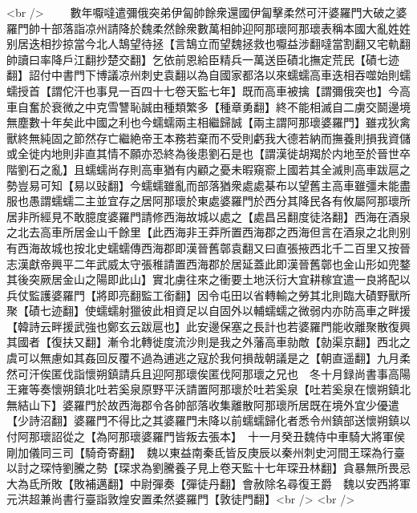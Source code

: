 <br />
　　數年嚈噠遣彌俄突弟伊匐帥餘衆還國伊匐擊柔然可汗婆羅門大破之婆羅門帥十部落詣凉州請降於魏柔然餘衆數萬相帥迎阿那瓌阿那瓌表稱本國大亂姓姓别居迭相抄掠當今北人鵠望待拯【言鵠立而望魏拯救也嚈益涉翻噠當割翻又宅軌翻帥讀曰率降戶江翻抄楚交翻】乞依前恩給臣精兵一萬送臣磧北撫定荒民【磧七迹翻】詔付中書門下博議凉州刺史袁翻以為自國家都洛以來蠕蠕高車迭相吞噬始則蠕蠕授首【謂佗汗也事見一百四十七卷天監七年】既而高車被擒【謂彌俄突也】今高車自奮於衰微之中克雪讐恥誠由種類繁多【種章勇翻】終不能相滅自二虜交鬬邊境無塵數十年矣此中國之利也今蠕蠕兩主相繼歸誠【兩主謂阿那瓌婆羅門】雖戎狄禽獸終無純固之節然存亡繼絶帝王本務若棄而不受則虧我大德若納而撫養則損我資儲或全徙内地則非直其情不願亦恐終為後患劉石是也【謂漢徙胡羯於内地至於晉世卒階劉石之亂】且蠕蠕尚存則高車猶有内顧之憂未暇窺窬上國若其全滅則高車跋扈之勢豈易可知【易以䜴翻】今蠕蠕雖亂而部落猶衆處處棊布以望舊主高車雖彊未能盡服也愚謂蠕蠕二主並宜存之居阿那瓌於東處婆羅門於西分其降民各有攸屬阿那瓌所居非所經見不敢臆度婆羅門請修西海故城以處之【處昌呂翻度徒洛翻】西海在酒泉之北去高車所居金山千餘里【此西海非王莽所置西海郡之西海但言在酒泉之北則别有西海故城也按北史蠕蠕傳西海郡即漢晉舊鄣袁翻又曰直張掖西北千二百里又按晉志漢獻帝興平二年武威太守張稚請置西海郡於居延蓋此即漢晉舊鄣也金山形如兜鍪其後突厥居金山之陽即此山】實北虜往來之衝要土地沃衍大宜耕稼宜遣一良將配以兵仗監護婆羅門【將即亮翻監工銜翻】因令屯田以省轉輸之勞其北則臨大磧野獸所聚【磧七迹翻】使蠕蠕射獵彼此相資足以自固外以輔蠕蠕之微弱内亦防高車之畔援【韓詩云畔援武強也鄭玄云跋扈也】此安邊保塞之長計也若婆羅門能收離聚散復興其國者【復扶又翻】漸令北轉徙度流沙則是我之外藩高車勍敵【勍渠京翻】西北之虞可以無慮如其姦回反覆不過為逋逃之寇於我何損哉朝議是之【朝直遥翻】九月柔然可汗俟匿伐詣懷朔鎮請兵且迎阿那瓌俟匿伐阿那瓌之兄也　冬十月録尚書事高陽王雍等奏懷朔鎮北吐若奚泉原野平沃請置阿那瓌於吐若奚泉【吐若奚泉在懷朔鎮北無結山下】婆羅門於故西海郡令各帥部落收集離散阿那瓌所居既在境外宜少優遣【少詩沼翻】婆羅門不得比之其婆羅門未降以前蠕蠕歸化者悉令州鎮部送懷朔鎮以付阿那瓌詔從之【為阿那瓌婆羅門皆叛去張本】　十一月癸丑魏侍中車騎大將軍侯剛加儀同三司【騎奇寄翻】　魏以東益南秦氐皆反庚辰以秦州刺史河間王琛為行臺以討之琛恃劉騰之勢【琛求為劉騰養子見上卷天監十七年琛丑林翻】貪暴無所畏忌大為氐所敗【敗補邁翻】中尉彈奏【彈徒丹翻】會赦除名尋復王爵　魏以安西將軍元洪超兼尚書行臺詣敦煌安置柔然婆羅門【敦徒門翻】<br />
<br />
